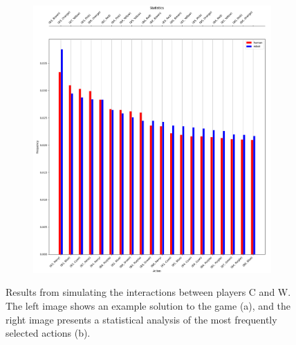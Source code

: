 \begin{flushleft}
\begin{flushleft}
\begin{figure}[H]
\begin{subfigure}[b]{0.45\textwidth}
                \includegraphics[width=\textwidth]{images/cw-stats.png}
                \caption{}
                \label{fig:cw-stats}
            \end{subfigure}
            \caption{Results from simulating the interactions between players C and W. The left image shows an example solution to the game (a), and the right image presents a statistical analysis of the most frequently selected actions (b).}
            \label{fig:cw-simulation}
        \end{figure}


\end{flushleft}
\end{flushleft}

